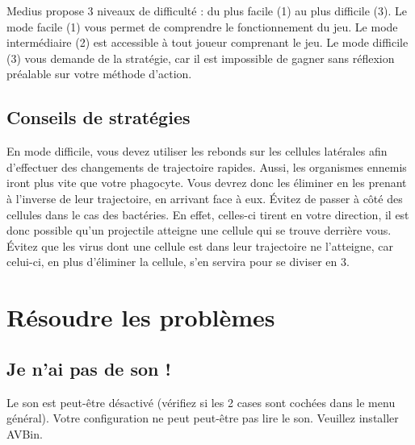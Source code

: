 \documentclass{article}
\begin{document}
Medius propose 3 niveaux de difficulté : du plus facile (1) au plus difficile (3).
\newline\newline
Le mode facile (1) vous permet de comprendre le fonctionnement du jeu.
Le mode intermédiaire (2) est accessible à tout joueur comprenant le jeu.
Le mode difficile (3) vous demande de la stratégie, car il est impossible de gagner sans réflexion préalable sur votre méthode d'action.
\newline\newline

\subsection{Conseils de stratégies}

En mode difficile, vous devez utiliser les rebonds sur les cellules latérales afin d'effectuer des changements de trajectoire rapides.
\newline\newline
Aussi, les organismes ennemis iront plus vite que votre phagocyte. Vous devrez donc les éliminer en les prenant à l'inverse de leur trajectoire, en arrivant face à eux.
\newline\newline
Évitez de passer à côté des cellules dans le cas des bactéries. En effet, celles-ci tirent en votre direction, il est donc possible qu'un projectile atteigne une cellule qui se trouve derrière vous.
\newline\newline
Évitez que les virus dont une cellule est dans leur trajectoire ne l'atteigne, car celui-ci, en plus d'éliminer la cellule, s'en servira pour se diviser en 3.
\newline\newline

\section{Résoudre les problèmes}

\subsection{Je n'ai pas de son !}

Le son est peut-être désactivé (vérifiez si les 2 cases sont cochées dans le menu général).
\newline\newline
Votre configuration ne peut peut-être pas lire le son. Veuillez installer AVBin.
\newline\newline
\end{document}
